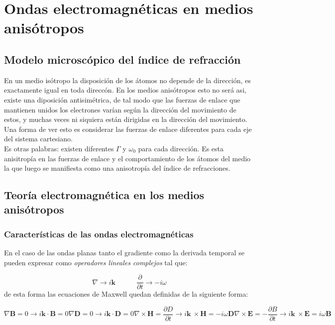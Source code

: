 \documentclass[12pt,a4paper]{article}
\newcommand{\parciales}[2]{\frac{\partial #1}{\partial #2}}
\newcommand{\tquad}{\quad \quad \quad}
\newcommand{\rota}{\nabla \times}
\newcommand{\Bn}{\mathbf{B}}
\newcommand{\En}{\mathbf{E}}
\newcommand{\Dn}{\mathbf{D}}
\newcommand{\Hn}{\mathbf{H}}
\newcommand{\kn}{\mathbf{k}}
\numberwithin{equation}{section}
\numberwithin{figure}{section}
\begin{document}
\newpage

\section{Ondas electromagnéticas en medios anisótropos}

\subsection{Modelo microscópico del índice de refracción}

En un medio isótropo la disposición de los átomos no depende de la dirección, es exactamente igual en toda direccón. En los medios anisótropos esto no será asi, existe una diposición antisimétrica, de tal modo que las fuerzas de enlace que mantienen unidos los electrones varían según la dirección del movimiento de estos, y muchas veces ni siquiera están dirigidas en la dirección del movimiento. Una forma de ver esto es considerar las fuerzas de enlace diferentes para cada eje del sistema cartesiano. \\

Es otras palabras: existen diferentes $\Gamma$ y $\omega_0$ para cada dirección. Es esta anisitropía en las fuerzas de enlace y el comportamiento de los átomos del medio la que luego se manifiesta como una anisotropía del índice de refracciones. 


\subsection{Teoría electromagnética en los medios anisótropos}

\subsubsection{Características de las ondas electromagnéticas}

En el caso de las ondas planas tanto el gradiente como la derivada temporal se pueden expresar como \textit{operadores lineales complejos} tal que:

\begin{equation}
\nabla \rightarrow  i \kn \tquad \parciales{}{t} \rightarrow - i \omega
\end{equation}
de esta forma las ecuaciones de Maxwell quedan definidas de la siguiente forma:

\begin{subequations}
\begin{equation}
\nabla \Bn = 0 \longrightarrow i \kn \cdot \Bn = 0 \label{Ec:10.2.0.2a}
\end{equation}
\begin{equation}
\nabla \Dn = 0 \longrightarrow i \kn \cdot \Dn = 0
\end{equation}
\begin{equation}
\rota \Hn = \parciales{D}{t} \longrightarrow i \kn \ \times \Hn = - i \omega \Dn
\end{equation}
\begin{equation}
\rota \En = -\parciales{B}{t} \longrightarrow i \kn \ \times \En = i \omega \Bn
\end{equation}
\end{subequations}
\end{document}
